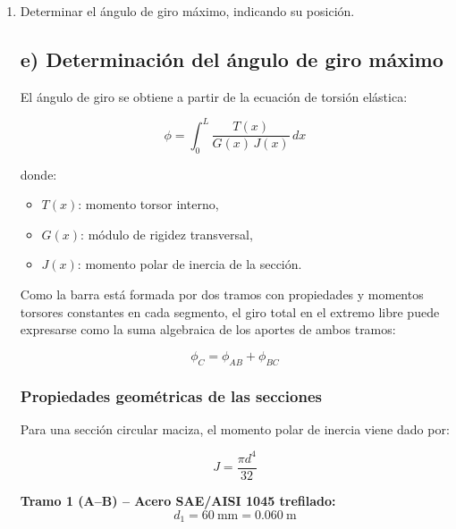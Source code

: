 \documentclass[12pt,a4paper]{article}
\begin{document}
\begin{enumerate}
El valor máximo del momento torsor se localiza en el tramo B--C. En A, el torsor interno es de $+300$ N$\cdot$m, mientras que en B se produce una discontinuidad asociada a la aplicación de $M_1$, pasando de $+300$ N$\cdot$m a $-500$ N$\cdot$m. Desde ese punto hasta el extremo libre C, el diagrama permanece constante, por lo que el valor absoluto máximo del torsor se mantiene en todo el tramo B--C.

\item[e)] Determinar el ángulo de giro máximo, indicando su posición.

\subsection*{e) Determinación del ángulo de giro máximo}

El ángulo de giro se obtiene a partir de la ecuación de torsión elástica:

\begin{equation}
\phi = \int_0^L \frac{T(x)}{G(x)\,J(x)} \, dx
\end{equation}

donde:
\begin{itemize}
    \item $T(x)$: momento torsor interno,
    \item $G(x)$: módulo de rigidez transversal,
    \item $J(x)$: momento polar de inercia de la sección.
\end{itemize}

Como la barra está formada por dos tramos con propiedades y momentos torsores constantes en cada segmento, el giro total en el extremo libre puede expresarse como la suma algebraica de los aportes de ambos tramos:

\begin{equation}
\phi_C = \phi_{AB} + \phi_{BC}
\end{equation}

\subsubsection*{Propiedades geométricas de las secciones}

Para una sección circular maciza, el momento polar de inercia viene dado por:

\begin{equation}
J = \frac{\pi d^4}{32}
\end{equation}

\textbf{Tramo 1 (A--B) -- Acero SAE/AISI 1045 trefilado:}
\begin{equation}
d_1 = 60\ \text{mm} = 0.060\ \text{m}
\end{equation}


\end{enumerate}
\end{document}
